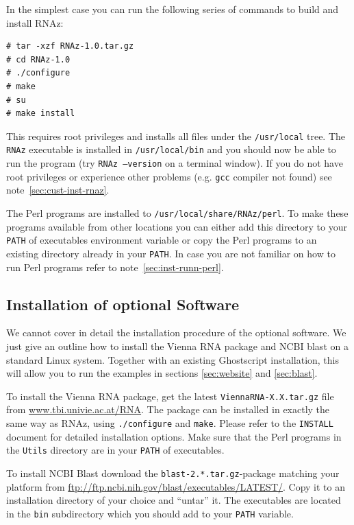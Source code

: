 \documentclass[11pt]{article}
\begin{document}
In the simplest case you can run the following series of commands to build
and install RNAz:

\begin{verbatim}
# tar -xzf RNAz-1.0.tar.gz
# cd RNAz-1.0 
# ./configure
# make
# su
# make install
\end{verbatim}

This requires root privileges and installs all files under the
\texttt{/usr/local} tree. The \texttt{RNAz} executable is installed in
\texttt{/usr/local/bin} and you should now be able to run the program (try
\texttt{RNAz --version} on a terminal window). If you do not have root
privileges or experience other problems (e.g. \texttt{gcc} compiler not
found) see note~\ref{sec:cust-inst-rnaz}.

The Perl programs are installed to \texttt{/usr/local/share/RNAz/perl}. To
make these programs available from other locations you can either add this
directory to your \texttt{PATH} of executables environment variable or copy
the Perl programs to an existing directory already in your \texttt{PATH}.
In case you are not familiar on how to run Perl programs refer to
note~\ref{sec:inst-runn-perl}.

\subsection{Installation of optional Software}
\label{sec:inst-opti-softw}

We cannot cover in detail the installation procedure of the optional
software. We just give an outline how to install the Vienna RNA
package and NCBI blast on a standard Linux system. Together with an
existing Ghostscript installation, this will allow you to run the
examples in sections \ref{sec:website} and \ref{sec:blast}. 

To install the Vienna RNA package, get the latest
\texttt{ViennaRNA-X.X.tar.gz} file from
\url{www.tbi.univie.ac.at/RNA}. The package can be installed in
exactly the same way as RNAz, using \texttt{./configure} and
\texttt{make}. Please refer to the \texttt{INSTALL} document for
detailed installation options. Make sure that the Perl programs in the
\texttt{Utils} directory are in your \texttt{PATH} of executables.

To install NCBI Blast download the \texttt{blast-2.*.tar.gz}-package
matching your platform from
\url{ftp://ftp.ncbi.nih.gov/blast/executables/LATEST/}. Copy it to an
installation directory of your choice and ``untar'' it. The
executables are located in the \texttt{bin} subdirectory which you
should add to your \texttt{PATH} variable.
\end{document}
